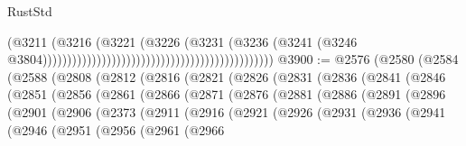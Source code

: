 \begin{lexlean}{RustStd}
\begin{coremodule}
                                                                                  (@3211
                                                                                    (@3216
                                                                                      (@3221
                                                                                        (@3226
                                                                                          (@3231
                                                                                            (@3236
                                                                                              (@3241
                                                                                                (@3246
                                                                                                  @3804)))))))))))))))))))))))))))))))))))))))))))))))
@3900 := @2576
    (@2580
      (@2584
        (@2588
          (@2808
            (@2812
              (@2816
                (@2821
                  (@2826
                    (@2831
                      (@2836
                        (@2841
                          (@2846
                            (@2851
                              (@2856
                                (@2861
                                  (@2866
                                    (@2871
                                      (@2876
                                        (@2881
                                          (@2886
                                            (@2891
                                              (@2896
                                                (@2901
                                                  (@2906
                                                    (@2373
                                                      (@2911
                                                        (@2916
                                                          (@2921
                                                            (@2926
                                                              (@2931
                                                                (@2936
                                                                  (@2941
                                                                    (@2946
                                                                      (@2951
                                                                        (@2956
                                                                          (@2961
                                                                            (@2966

\end{coremodule}
\end{lexlean}
